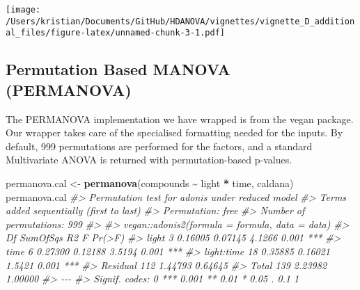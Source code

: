\documentclass[
]{article}
\newenvironment{Shaded}{\begin{snugshade}}{\end{snugshade}}
\newcommand{\CommentTok}[1]{\textcolor[rgb]{0.56,0.35,0.01}{\textit{#1}}}
\newcommand{\FunctionTok}[1]{\textcolor[rgb]{0.13,0.29,0.53}{\textbf{#1}}}
\newcommand{\NormalTok}[1]{#1}
\newcommand{\OtherTok}[1]{\textcolor[rgb]{0.56,0.35,0.01}{#1}}
\newcommand{\SpecialCharTok}[1]{\textcolor[rgb]{0.81,0.36,0.00}{\textbf{#1}}}
\begin{document}
\texttt{[image: /Users/kristian/Documents/GitHub/HDANOVA/vignettes/vignette\_D\_additional\_files/figure-latex/unnamed-chunk-3-1.pdf]}

\subsection{Permutation Based MANOVA
(PERMANOVA)}\label{permutation-based-manova-permanova}

The PERMANOVA implementation we have wrapped is from the vegan package.
Our wrapper takes care of the specialised formatting needed for the
inputs. By default, 999 permutations are performed for the factors, and
a standard Multivariate ANOVA is returned with permutation-based
p-values.

\begin{Shaded}
\begin{Highlighting}[]
\NormalTok{permanova.cal }\OtherTok{\textless{}{-}} \FunctionTok{permanova}\NormalTok{(compounds }\SpecialCharTok{\textasciitilde{}}\NormalTok{ light }\SpecialCharTok{*}\NormalTok{ time, caldana)}
\NormalTok{permanova.cal}
\CommentTok{\#\textgreater{} Permutation test for adonis under reduced model}
\CommentTok{\#\textgreater{} Terms added sequentially (first to last)}
\CommentTok{\#\textgreater{} Permutation: free}
\CommentTok{\#\textgreater{} Number of permutations: 999}
\CommentTok{\#\textgreater{} }
\CommentTok{\#\textgreater{} vegan::adonis2(formula = formula, data = data)}
\CommentTok{\#\textgreater{}             Df SumOfSqs      R2      F Pr(\textgreater{}F)    }
\CommentTok{\#\textgreater{} light        3  0.16005 0.07145 4.1266  0.001 ***}
\CommentTok{\#\textgreater{} time         6  0.27300 0.12188 3.5194  0.001 ***}
\CommentTok{\#\textgreater{} light:time  18  0.35885 0.16021 1.5421  0.001 ***}
\CommentTok{\#\textgreater{} Residual   112  1.44793 0.64645                  }
\CommentTok{\#\textgreater{} Total      139  2.23982 1.00000                  }
\CommentTok{\#\textgreater{} {-}{-}{-}}
\CommentTok{\#\textgreater{} Signif. codes:  0 \textquotesingle{}***\textquotesingle{} 0.001 \textquotesingle{}**\textquotesingle{} 0.01 \textquotesingle{}*\textquotesingle{} 0.05 \textquotesingle{}.\textquotesingle{} 0.1 \textquotesingle{} \textquotesingle{} 1}
\end{Highlighting}
\end{Shaded}
\end{document}
